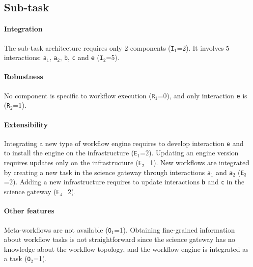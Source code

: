 \documentclass[preprint,3p,twocolumn]{elsarticle}
\newcommand{\todo}[1]{\color{blue}\xspace[\emph{#1}]\xspace\color{black}}
\begin{document}
\subsection{Sub-task}

\paragraph{Integration} The sub-task architecture requires only 2
components (\texttt{I$_1$}=2).  It involves 5 interactions:
\texttt{a$_1$}, \texttt{a$_2$}, \texttt{b}, \texttt{c} and
\texttt{e} (\texttt{I$_2$}=5).

\paragraph{Robustness} No component is specific to workflow execution
(\texttt{R$_1$}=0), and only interaction \texttt{e} is
(\texttt{R$_2$}=1).

\paragraph{Extensibility} Integrating a new type of workflow engine
requires to develop interaction \texttt{e} and to install the engine
on the infrastructure (\texttt{E$_1$}=2). Updating an engine version
requires updates only on the infrastructure (\texttt{E$_2$}=1).  New
workflows are integrated by creating a new task in the science gateway
through interactions \texttt{a$_1$} and \texttt{a$_2$}  (\texttt{E$_3$}=2). Adding a new
infrastructure requires to update interactions \texttt{b} and
\texttt{c} in the science gateway (\texttt{E$_4$}=2).

\paragraph{Other features} Meta-workflows are not available
(\texttt{O$_1$}=1).  Obtaining fine-grained information about workflow
tasks is not straightforward since the science gateway has no
knowledge about the workflow topology, and the workflow engine is
integrated as a task (\texttt{O$_2$}=1).

\end{document}
